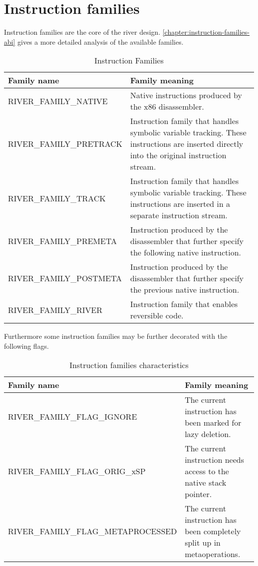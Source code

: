 \documentclass[12pt]{report}
\begin{document}
\section{Instruction families}
\label{sec:instrfamilies}
Instruction families are the core of the river design. \autoref{chapter:instruction-families-abi} gives a more detailed analysis of the available families.\\
\begin{table}[H]
	\begin{tabular}{| p{6cm} | p{10cm} |}
		\hline
		\textbf{Family name} & \textbf{Family meaning}\\ \hline
		RIVER_FAMILY_NATIVE & Native instructions produced by the x86 disassembler.\\ \hline
		RIVER_FAMILY_PRETRACK & Instruction family that handles symbolic variable tracking. These instructions are inserted directly into the original instruction stream.\\ \hline
		RIVER_FAMILY_TRACK & Instruction family that handles symbolic variable tracking. These instructions are inserted in a separate instruction stream.\\ \hline
		RIVER_FAMILY_PREMETA & Instruction produced by the disassembler that further specify the following native instruction.\\ \hline
		RIVER_FAMILY_POSTMETA & Instruction produced by the disassembler that further specify the previous native instruction.\\ \hline
		RIVER_FAMILY_RIVER & Instruction family that enables reversible code.\\ \hline
	\end{tabular}
	\caption{Instruction Families}
	\label{table:instruction-families}
\end{table}
Furthermore some instruction families may be further decorated with the following flags.\\
\begin{table}[H]
	\begin{tabular}{| p{8cm} | p{8cm} |}
		\hline
		\textbf{Family name} & \textbf{Family meaning}\\ \hline
		RIVER_FAMILY_FLAG_IGNORE & The current instruction has been marked for lazy deletion.\\ \hline
		RIVER_FAMILY_FLAG_ORIG_xSP & The current instruction needs access to the native stack pointer.\\ \hline
		RIVER_FAMILY_FLAG_METAPROCESSED & The current instruction has been completely split up in metaoperations.\\ \hline
	\end{tabular}
	\caption{Instruction families characteristics}
\end{table}
\end{document}
